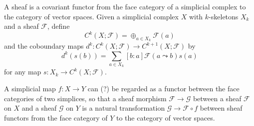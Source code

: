 \documentclass{letter}
\begin{document}
  A sheaf is a covariant functor from the face category of a simplicial
  complex to the category of vector spaces. Given a simplicial complex
  $X$ with $k$-skeletons $X_k$ and a sheaf $\mathscr{F}$, define
  $$
  C^k(X; \mathscr{F}) = \oplus_{a \in X_k} \mathscr{F}(a)
  $$
  and the coboundary maps
  $d^k : C^k(X; \mathscr{F}) \to C^{k+1}(X; \mathscr{F})$ by
  $$
  d^k(s(b)) = \sum_{a \in X_k} [b:a] \mathscr{F}(a \leadsto b) s(a)
  $$
  for any map $s : X_k \to C^k(X; \mathscr{F})$.

  A simplicial map $f : X \to Y$ can (?) be regarded as a functor
  between the face categories of two simplices, so that a
  sheaf morphism $\mathscr{F} \to \mathscr{G}$ between a sheaf
  $\mathscr{F}$ on $X$ and a sheaf $\mathscr{G}$ on $Y$ is a natural
  transformation  $\mathscr{G} \to \mathscr{F} \circ f$ between sheaf functors
  from the face category of $Y$ to the category of vector spaces.

\end{document}
